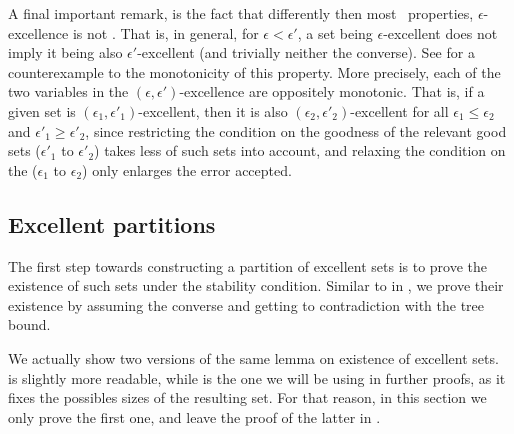        \begin{remark} \label{rmk:excellence_is_not_monotonic}
            A final important remark, is the fact that differently then most \regular~properties, $\epsilon$-excellence is
            not .
            That is, in general, for $\epsilon < \epsilon'$, a set being $\epsilon$-excellent does not imply
            it being also $\epsilon'$-excellent (and trivially neither the converse).
            See  for a counterexample to the monotonicity of this property.
            More precisely, each of the two variables in the $(\epsilon, \epsilon')$-excellence are oppositely monotonic.
            That is, if a given set is $(\epsilon_1, \epsilon'_1)$-excellent, then it is also
            $(\epsilon_2, \epsilon'_2)$-excellent for all $\epsilon_1 \leq \epsilon_2$ and $\epsilon'_1 \geq \epsilon'_2$,
            since restricting the condition on the goodness of the relevant good sets ($\epsilon'_1$ to $\epsilon'_2$)
            takes less of such sets into account, and relaxing the condition on the 
            ($\epsilon_1$ to $\epsilon_2$) only enlarges the error accepted.
        \end{remark}

        

    \subsection{Excellent partitions} \label{subsec:subsection_5.2}

        The first step towards constructing a partition of excellent sets is to prove the existence of such
        sets under the stability condition.
        Similar to  in , we prove their existence by assuming
        the converse and getting to contradiction with the tree bound.

        We actually show two versions of the same lemma on existence of excellent sets.
         is slightly more readable, while
         is the one we will be using in further
        proofs, as it fixes the possibles sizes of the resulting set.
        For that reason, in this section we only prove the first one, and leave the proof of the latter in
        .

